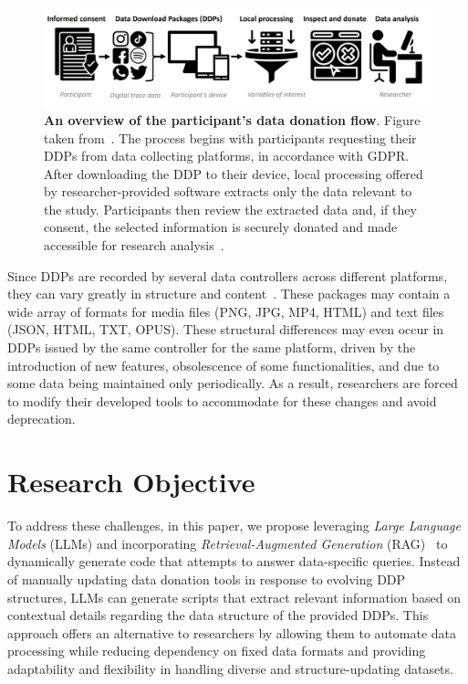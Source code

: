 \documentclass{DESSThesis}
\begin{document}
\begin{figure}[htb!]
	\centering
	\includegraphics[width=0.9\linewidth]{img/Introduction/data_donation_overview.png}
	\caption[An overview of the participant's data donation flow]{\textbf{An overview of the participant's data donation flow}. Figure taken from~\cite{Boeschoten2023}. The process begins with participants requesting their DDPs from data collecting platforms, in accordance with GDPR. After downloading the DDP to their device, local processing offered by researcher-provided software extracts only the data relevant to the study. Participants then review the extracted data and, if they consent, the selected information is securely donated and made accessible for research analysis~\cite{Boeschoten2023}.}
	\label{fig:data_donation_overview}
\end{figure}

Since DDPs are recorded by several data controllers across different platforms, they can vary greatly in structure and content~\cite{boeschoten2021automatic}. These packages may contain a wide array of formats for media files (PNG, JPG, MP4, HTML) and text files (JSON, HTML, TXT, OPUS). These structural differences may even occur in DDPs issued by the same controller for the same platform, driven by the introduction of new features, obsolescence of some functionalities, and due to some data being maintained only periodically. As a result, researchers are forced to modify their developed tools to accommodate for these changes and avoid deprecation.

\section{Research Objective} \label{research_objective}

To address these challenges, in this paper, we propose leveraging \emph{Large Language Models} (LLMs) and incorporating \emph{Retrieval-Augmented Generation} (RAG)~\cite{lewis2020retrieval} to dynamically generate code that attempts to answer data-specific queries. Instead of manually updating data donation tools in response to evolving DDP structures, LLMs can generate scripts that extract relevant information based on contextual details regarding the data structure of the provided DDPs. This approach offers an alternative to researchers by allowing them to automate data processing while reducing dependency on fixed data formats and providing adaptability and flexibility in handling diverse and structure-updating datasets.
\end{document}
